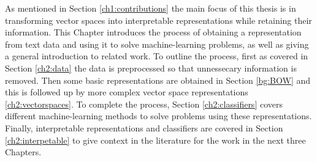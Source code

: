 







As mentioned in Section \ref{ch1:contributions} the main focus of this thesis is in transforming vector spaces into interpretable representations while retaining their information. This Chapter introduces the process of obtaining a representation from text data and using it to solve machine-learning problems, as well as giving a general introduction to related work. To outline the process, first as covered in Section \ref{ch2:data} the data is preprocessed so that unnessecary information is removed. Then some basic representations are obtained in Section \ref{bg:BOW} and this is followed up by more complex vector space representations \ref{ch2:vectorspaces}. To complete the process, Section \ref{ch2:classifiers} covers different machine-learning methods to solve problems using these representations. Finally, interpretable representations and classifiers are covered in Section \ref{ch2:interpetable} to give context in the literature for the work in the next three Chapters. 


